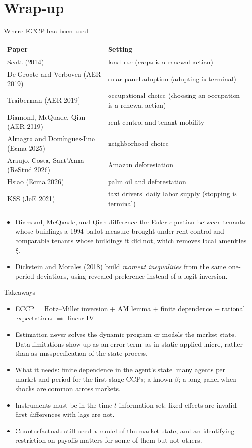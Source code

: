 \documentclass[aspectratio=169,11pt]{beamer}
\begin{document}
\section{Wrap-up}

\begin{frame}{Where ECCP has been used}
\footnotesize
\begin{tabular}{ll}
\toprule
Paper & Setting\\
\midrule
Scott (2014) & land use (crops is a renewal action)\\
De Groote and Verboven (AER 2019) & solar panel adoption (adopting is terminal)\\
Traiberman (AER 2019) & occupational choice (choosing an occupation is a renewal action)\\
Diamond, McQuade, Qian (AER 2019) & rent control and tenant mobility\\
Almagro and Dom\'inguez-Iino (Ecma 2025) & neighborhood choice\\
Araujo, Costa, Sant'Anna (ReStud 2026) & Amazon deforestation\\
Hsiao (Ecma 2026) & palm oil and deforestation\\
KSS (JoE 2021) & taxi drivers' daily labor supply (stopping is terminal)\\
\bottomrule
\end{tabular}
\begin{itemize}
\item Diamond, McQuade, and Qian difference the Euler equation between tenants whose buildings a 1994 ballot measure brought under rent control and comparable tenants whose buildings it did not, which removes local amenities $\xi$.
\item Dickstein and Morales (2018) build \emph{moment inequalities} from the same one-period deviations, using revealed preference instead of a logit inversion.
\end{itemize}
\end{frame}

\begin{frame}{Takeaways}
\begin{itemize}
\item ECCP = Hotz--Miller inversion + AM lemma + finite dependence + rational expectations $\Rightarrow$ \alert{linear IV}.
\item Estimation never solves the dynamic program or models the market state. Data limitations show up as an error term, as in static applied micro, rather than as misspecification of the state process.
\item What it needs: finite dependence in the agent's state; many agents per market and period for the first-stage CCPs; a known $\beta$; a long panel when shocks are common across markets.
\item Instruments must be in the time-$t$ information set: fixed effects are invalid, first differences with lags are not.
\item Counterfactuals still need a model of the market state, and an identifying restriction on payoffs matters for some of them but not others.
\end{itemize}
\end{frame}
\end{document}
